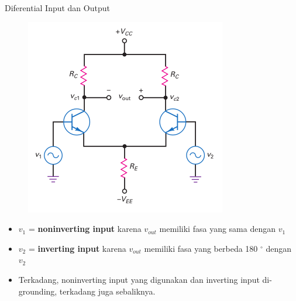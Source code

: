 \documentclass[aspectratio=169]{beamer}
\begin{document}
\begin{frame}{Diferential Input dan Output}
	\begin{multicols}{2}
		\begin{figure}
			\centering
			\includegraphics[height=0.7\textheight]{gambar/01.differential_input_output}
		\end{figure}
		\columnbreak
		\begin{itemize}
			\item $ v_1 $ = \textbf{noninverting input} karena $ v_{out} $ memiliki fasa yang sama dengan $ v_1 $
			\item $ v_2 $ = \textbf{inverting input} karena $ v_{out} $ memiliki fasa yang berbeda 180 $ ^{\circ} $ dengan $ v_2 $
			\item Terkadang, noninverting input yang digunakan dan  inverting input di-grounding, terkadang juga sebaliknya.
		\end{itemize}
	\end{multicols}
\end{frame}
\end{document}
